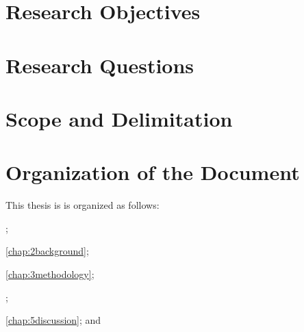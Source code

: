 
\section{Research Objectives}




\section{Research Questions}




\section{Scope and Delimitation}




\section{Organization of the Document}

This thesis is is organized as follows: 
\begin{inparaenum}[(a)]
\item {};
\item \cref{chap:2background};
\item \cref{chap:3methodology};
\item {};
\item \cref{chap:5discussion}; and
\item {}
\end{inparaenum}
